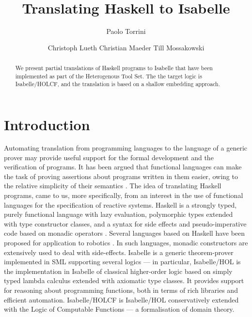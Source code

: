 \documentclass{llncs}
\begin{document}
\title{Translating Haskell to Isabelle}
\author{ Paolo Torrini \and
  Christoph Lueth
  Christian Maeder
  Till Mossakowski
}

\maketitle

\begin{abstract}
  We present partial translations of Haskell programs to Isabelle that have
  been implemented as part of the Heterogenous Tool Set. The the target logic
  is Isabelle/HOLCF, and the translation is based on a shallow embedding
  approach.
\end{abstract}

\sloppy

\section{Introduction}
\label{intro}

Automating translation from programming languages to the language of a generic
prover may provide useful support for the formal development and the
verification of programs. It has been argued that functional languages can
make the task of proving assertions about programs written in them easier,
owing to the relative simplicity of their semantics
\cite{Thompson92,Thompson95}. The idea of translating Haskell programs, came
to us, more specifically, from an interest in the use of functional languages
for the specification of reactive systems. Haskell is a strongly typed, purely
functional language with lazy evaluation, polymorphic types extended with type
constructor classes, and a syntax for side effects and pseudo-imperative code
based on monadic operators \cite{HaskellRep}.  Several languages based on
Haskell have been proposed for application to robotics \cite{phh99,Hudak2003}.
In such languages, monadic constructors are extensively used to deal with
side-effects. Isabelle is a generic theorem-prover implemented in SML
supporting several logics --- in particular, Isabelle/HOL is the
implementation in Isabelle of classical higher-order logic based on simply
typed lambda calculus extended with axiomatic type classes. It provides
support for reasoning about programming functions, both in terms of rich
libraries and efficient automation.  Isabelle/HOLCF \cite{holcf}
\cite{Paulson94isa,holcf} is Isabelle/HOL conservatively extended with the
Logic of Computable Functions --- a formalisation of domain theory.
\end{document}

